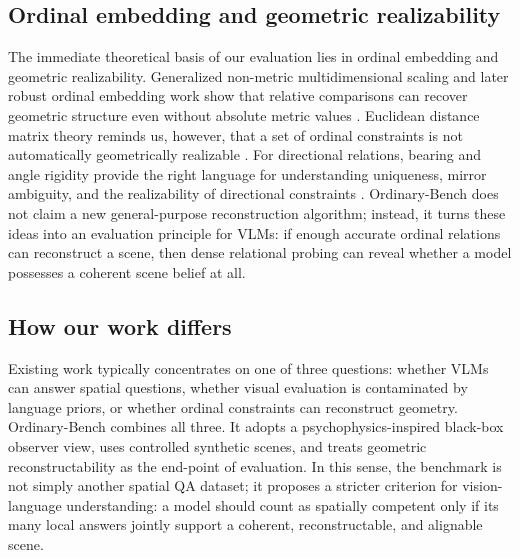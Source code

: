 \subsection{Ordinal embedding and geometric realizability}

The immediate theoretical basis of our evaluation lies in ordinal embedding and geometric realizability. Generalized non-metric multidimensional scaling and later robust ordinal embedding work show that relative comparisons can recover geometric structure even without absolute metric values \cite{agarwal2007gnmds,ma2018robustordinal}. Euclidean distance matrix theory reminds us, however, that a set of ordinal constraints is not automatically geometrically realizable \cite{dokmanic2015edm}. For directional relations, bearing and angle rigidity provide the right language for understanding uniqueness, mirror ambiguity, and the realizability of directional constraints \cite{zhao2019bearingrigidity,chen2021anglerigidity}. Ordinary-Bench does not claim a new general-purpose reconstruction algorithm; instead, it turns these ideas into an evaluation principle for VLMs: if enough accurate ordinal relations can reconstruct a scene, then dense relational probing can reveal whether a model possesses a coherent scene belief at all.

\subsection{How our work differs}

Existing work typically concentrates on one of three questions: whether VLMs can answer spatial questions, whether visual evaluation is contaminated by language priors, or whether ordinal constraints can reconstruct geometry. Ordinary-Bench combines all three. It adopts a psychophysics-inspired black-box observer view, uses controlled synthetic scenes, and treats geometric reconstructability as the end-point of evaluation. In this sense, the benchmark is not simply another spatial QA dataset; it proposes a stricter criterion for vision-language understanding: a model should count as spatially competent only if its many local answers jointly support a coherent, reconstructable, and alignable scene.
